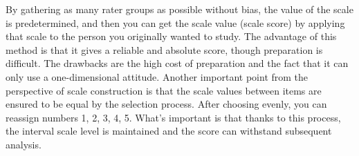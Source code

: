 \documentclass{ltjsbook}
\begin{document}
By gathering as many rater groups as possible without bias, the value of the scale is predetermined, and then you can get the scale value (scale score) by applying that scale to the person you originally wanted to study. The advantage of this method is that it gives a reliable and absolute score, though preparation is difficult. The drawbacks are the high cost of preparation and the fact that it can only use a one-dimensional attitude. Another important point from the perspective of scale construction is that the scale values between items are ensured to be equal by the selection process. After choosing evenly, you can reassign numbers 1, 2, 3, 4, 5. What's important is that thanks to this process, the interval scale level is maintained and the score can withstand subsequent analysis.

\end{document}
